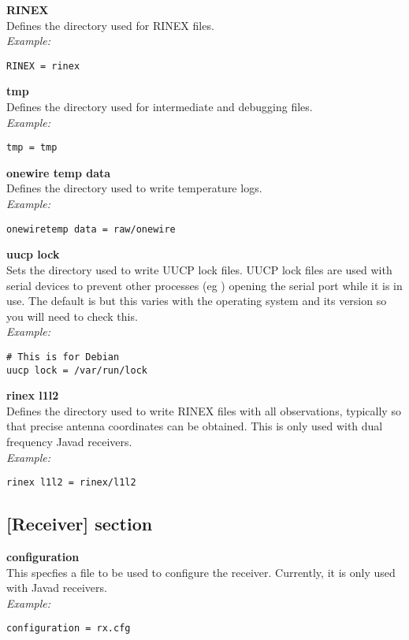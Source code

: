 {\bfseries RINEX}\\
Defines the directory used for RINEX files.\\
\textit{Example:}
\begin{lstlisting}
RINEX = rinex
\end{lstlisting}

{\bfseries tmp}\\
Defines the directory used for intermediate and debugging files.\\
\textit{Example:}
\begin{lstlisting}
tmp = tmp
\end{lstlisting}

{\bfseries onewire temp data}\\
Defines the directory used to write temperature logs.\\
\textit{Example:}
\begin{lstlisting}
onewiretemp data = raw/onewire
\end{lstlisting}

{\bfseries uucp lock}\\
Sets the directory used to write UUCP lock files. UUCP lock files are used with serial devices to prevent
other processes (eg ) opening the serial port while it is in use. The default is 
but this varies with the operating system and its version so you will need to check this.\\
\textit{Example:}
\begin{lstlisting}
# This is for Debian
uucp lock = /var/run/lock
\end{lstlisting}

{\bfseries rinex l1l2}\\ \hypertarget{h:paths_rinex_l1l2}{}
Defines the directory used to write RINEX files with all observations, typically so that precise antenna coordinates
can be obtained. This is only used with dual frequency Javad receivers.\\
\textit{Example:}
\begin{lstlisting}
rinex l1l2 = rinex/l1l2
\end{lstlisting}


\subsection{[Receiver] section \label{sgcreceiver}}

\hypertarget{h:receiver}{}

{\bfseries configuration}\\ \hypertarget{h:configuration}{}
This specfies a file to be used to configure the receiver. Currently, it is only used
with Javad receivers.\\
\textit{Example:}
\begin{lstlisting}
configuration = rx.cfg
\end{lstlisting}

